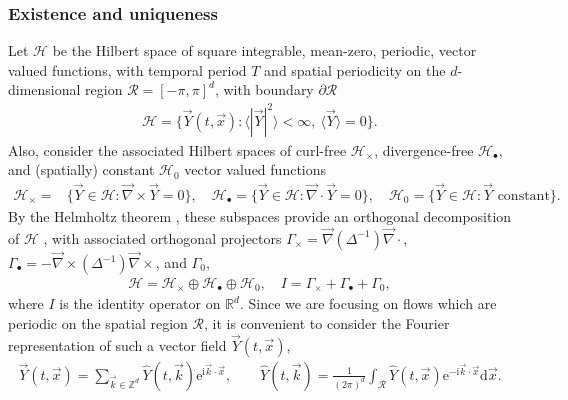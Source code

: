 \documentclass[11pt]{amsart}
\newcommand{\I}{\mathrm{i}}
\newcommand{\e}{\mathrm{e}}
\renewcommand{\d}{\mathrm{d}}
\begin{document}
\subsubsection{Existence and
  uniqueness}\label{sec:Existence_Uniqueness}
%
Let $\mathscr{H}$ be the Hilbert space of square integrable,
mean-zero, periodic, vector valued functions, with temporal 
period $T$ and spatial periodicity on the $d$-dimensional region
$\mathcal{R}=[-\pi,\pi]^d$, with boundary $\partial\mathcal{R}$    
%
\begin{align}
  \mathscr{H}=\{\vec{Y}(t,\vec{x}):\langle|\vec{Y}|^2\rangle<\infty, \ \langle\vec{Y}\rangle=0
  \}.  
\end{align}
%
Also, consider the associated Hilbert spaces of curl-free
$\mathscr{H}_\times$, divergence-free $\mathscr{H}_\bullet$, and
(spatially)
constant $\mathscr{H}_0$ vector valued functions   
%
\begin{align}
  \mathscr{H}_\times=&\{\vec{Y}\in\mathscr{H}:\vec{\nabla}\times\vec{Y}=0\}, \quad
  \mathscr{H}_\bullet=\{\vec{Y}\in\mathscr{H}:\vec{\nabla}\cdot\vec{Y}=0\},   \quad
  \mathscr{H}_0=\{\vec{Y}\in\mathscr{H}:\vec{Y} \text{ constant}\}. 
\end{align}
%
By the Helmholtz theorem
\cite{Denaro:2003:0271,Bhatia:IEE:1077}, these  
subspaces provide an orthogonal decomposition of 
$\mathscr{H}$ \cite{Fannjiang:SIAM_JAM:333}, with
associated orthogonal projectors
\cite{Fannjiang:SIAM_JAM:333,Murphy:CMS:Submitted}
$\Gamma_\times=\vec{\nabla}(\Delta^{-1})\vec{\nabla}\cdot$, $\Gamma_\bullet=-\vec{\nabla}\times(\Delta^{-1})\vec{\nabla}\times$, and
$\Gamma_0$, 
%
\begin{align}
  \mathscr{H}=\mathscr{H}_\times\oplus\mathscr{H}_\bullet\oplus\mathscr{H}_0,\quad
  I=\Gamma_\times+\Gamma_\bullet+\Gamma_0,
\end{align}
%
where $I$ is the identity operator on $\mathbb{R}^d$.
Since we are focusing on flows which are periodic on the spatial
region $\mathcal{R}$, it is convenient to consider the Fourier
representation of such a vector field $\vec{Y}(t,\vec{x})$, 
%
\begin{align}
  \vec{Y}(t,\vec{x})
    =\sum_{\vec{k}\in\mathbb{Z}^d}
       \hat{Y}(t,\vec{k})\e^{\I\vec{k}\cdot\vec{x}},
  \qquad
  \hat{Y}(t,\vec{k})
    =\frac{1}{(2\pi)^d}\int_{\mathcal{R}}
       \hat{Y}(t,\vec{x})\e^{-\I\vec{k}\cdot\vec{x}} \d\vec{x}.
\end{align}
\end{document}
